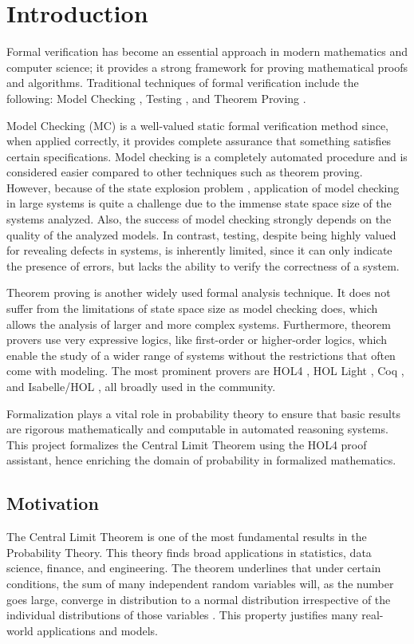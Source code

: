 \chapter{Introduction}
\label{intro}

Formal verification has become an essential approach in modern mathematics and computer science; it provides a strong framework for proving mathematical proofs and algorithms. Traditional techniques of formal verification include the following: Model Checking \cite{clarke2018handbook}, Testing \cite{broy2005model}, and Theorem Proving \cite{bertot2013interactive}.

Model Checking (MC) is a well-valued static formal verification method since, when applied correctly, it provides complete assurance that something satisfies certain specifications. Model checking is a completely automated procedure and is considered easier compared to other techniques such as theorem proving. However, because of the state explosion problem \cite{burch1992symbolic}, application of model checking in large systems is quite a challenge due to the immense state space size of the systems analyzed. Also, the success of model checking strongly depends on the quality of the analyzed models. In contrast, testing, despite being highly valued for revealing defects in systems, is inherently limited, since it can only indicate the presence of errors, but lacks the ability to verify the correctness of a system.

Theorem proving is another widely used formal analysis technique. It does not suffer from the limitations of state space size as model checking does, which allows the analysis of larger and more complex systems. Furthermore, theorem provers use very expressive logics, like first-order or higher-order logics, which enable the study of a wider range of systems without the restrictions that often come with modeling. The most prominent provers are HOL4 \cite{slind2008brief}, HOL Light \cite{hol_light}, Coq \cite{bertot2013interactive}, and Isabelle/HOL \cite{isabelle_hol}, all broadly used in the community.

Formalization plays a vital role in probability theory to ensure that basic results are rigorous mathematically and computable in automated reasoning systems. This project formalizes the Central Limit Theorem using the HOL4 proof assistant, hence enriching the domain of probability in formalized mathematics.

\section{Motivation}
The Central Limit Theorem is one of the most fundamental results in the Probability Theory. This theory finds broad applications in statistics, data science, finance, and engineering. The theorem underlines that under certain conditions, the sum of many independent random variables will, as the number goes large, converge in distribution to a normal distribution irrespective of the individual distributions of those variables \cite{chung2000course}. This property justifies many real-world applications and models.

